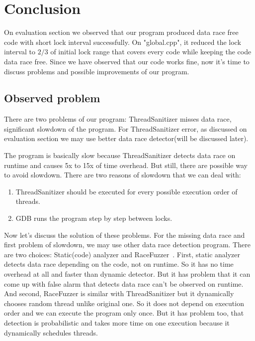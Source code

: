 \section{Conclusion}
\label{sec:conclusion}

On evaluation section we observed that our program produced data race free code with short lock interval successfully. On "global.cpp", it reduced the lock interval to $2/3$ of initial lock range that covers every code while keeping the code data race free. Since we have observed that our code works fine, now it's time to discuss problems and possible improvements of our program.

\subsection{Observed problem}
There are two problems of our program: ThreadSanitizer misses data race, significant slowdown of the program. For ThreadSanitizer error, as discussed on evaluation section we may use better data race detector(will be discussed later).

The program is basically slow because ThreadSanitizer detects data race on runtime and causes 5x to 15x of time overhead. But still, there are possible way to avoid slowdown. There are two reasons of slowdown that we can deal with:

\begin{enumerate}
    \item ThreadSanitizer should be executed for every possible execution order of threads.
    \item GDB runs the program step by step between locks.
\end{enumerate}

Now let's discuss the solution of these problems. For the missing data race and first problem of slowdown, we may use other data race detection program. There are two choices: Static(code) analyzer and RaceFuzzer~\cite{Sen:2008:RDR:1375581.1375584}. First, static analyzer detects data race depending on the code, not on runtime. So it has no time overhead at all and faster than dynamic detector. But it has problem that it can come up with false alarm that detects data race can't be observed on runtime. And second, RaceFuzzer is similar with ThreadSanitizer but it dynamically chooses random thread unlike original one. So it does not depend on execution order and we can execute the program only once. But it has problem too, that detection is probabilistic and takes more time on one execution because it dynamically schedules threads.

